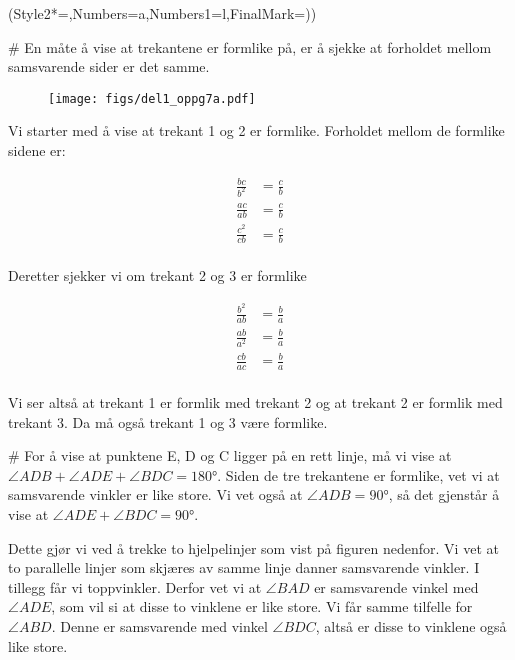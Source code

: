 \begin{easylist}[enumerate]
	\ListProperties(Style2*=,Numbers=a,Numbers1=l,FinalMark={)})
	
	# En måte å vise at trekantene er formlike på, er å sjekke at forholdet mellom samsvarende sider er det samme. 
	
	\begin{figure}[ht!]
		\centering
		\texttt{[image: figs/del1\_oppg7a.pdf]}
		\label{fig:del1_oppg7a}
	\end{figure}	
	
		Vi starter med å vise at trekant 1 og 2 er formlike. Forholdet mellom de formlike sidene er:
		
	
	\begin{equation*}
		\begin{aligned}
			\frac{bc}{b^2} & = \frac{c}{b} \\
			\frac{ac}{ab} & = \frac{c}{b} \\
			\frac{c^2}{cb} & = \frac{c}{b} \\			
		\end{aligned}
	\end{equation*}
	
	Deretter sjekker vi om trekant 2 og 3 er formlike
	
	\begin{equation*}
		\begin{aligned}
			\frac{b^2}{ab} & = \frac{b}{a} \\
			\frac{ab}{a^2} & = \frac{b}{a} \\
			\frac{cb}{ac} & = \frac{b}{a} \\			
		\end{aligned}
	\end{equation*}
	
	Vi ser altså at trekant 1 er formlik med trekant 2 og at trekant 2 er formlik med trekant 3. Da må også trekant 1 og 3 være formlike. 
	
	# For å vise at punktene E, D og C ligger på en rett linje, må vi vise at $ \angle ADB + \angle ADE + \angle BDC = \ang{180} $. Siden de tre trekantene er formlike, vet vi at samsvarende vinkler er like store. Vi vet også at $\angle ADB = \ang{90}$, så det gjenstår å vise at $\angle ADE + \angle BDC = \ang{90}$.
	
	Dette gjør vi ved å trekke to hjelpelinjer som vist på figuren nedenfor. Vi vet at to parallelle linjer som skjæres av samme linje danner samsvarende vinkler. I tillegg får vi toppvinkler. Derfor vet vi at $\angle BAD$ er samsvarende vinkel med $\angle ADE$, som vil si at disse to vinklene er like store. Vi får samme tilfelle for $\angle ABD$. Denne er samsvarende med vinkel $\angle BDC$, altså er disse to vinklene også like store.
	

\end{easylist}
